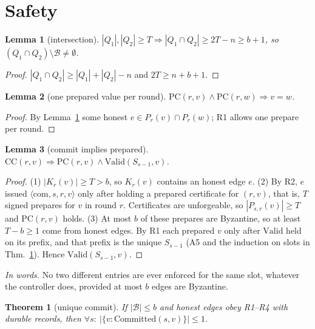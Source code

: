 \documentclass[conference]{IEEEtran}
\newtheorem{lemma}{Lemma}
\newtheorem{theorem}{Theorem}
\newcommand{\B}{\mathcal{B}}
\newcommand{\Pc}{\mathrm{PC}}
\newcommand{\Cc}{\mathrm{CC}}
\newcommand{\Val}{\mathrm{Valid}}
\newcommand{\Cm}{\mathrm{Committed}}
\newcommand{\words}[1]{\par\noindent\textit{In words.} #1\par\smallskip}
\begin{document}
\section{Safety}
\begin{lemma}[intersection]\label{lem:int}
$|Q_1|,|Q_2|\ge T\Rightarrow |Q_1\cap Q_2|\ge 2T-n\ge b+1$, so $(Q_1\cap Q_2)\setminus\B\ne\emptyset$.
\end{lemma}
\begin{proof}
$|Q_1\cap Q_2|\ge |Q_1|+|Q_2|-n$ and $2T\ge n+b+1$.
\end{proof}
\begin{lemma}[one prepared value per round]\label{lem:one}
$\Pc(r,v)\wedge\Pc(r,w)\Rightarrow v=w$.
\end{lemma}
\begin{proof}
By Lemma~\ref{lem:int} some honest $e\in P_r(v)\cap P_r(w)$; R1 allows one prepare per round.
\end{proof}
\begin{lemma}[commit implies prepared]\label{lem:cp}
$\Cc(r,v)\Rightarrow \Pc(r,v)\wedge \Val(S_{s-1},v)$.
\end{lemma}
\begin{proof}
(1) $|K_r(v)|\ge T>b$, so $K_r(v)$ contains an honest edge $e$. (2) By R2, $e$ issued $\langle\mathrm{com},s,r,v\rangle$ only after holding a prepared certificate for $(r,v)$, that is, $T$ signed prepares for $v$ in round $r$. Certificates are unforgeable, so $|P_{s,r}(v)|\ge T$ and $\Pc(r,v)$ holds. (3) At most $b$ of these prepares are Byzantine, so at least $T-b\ge1$ come from honest edges. By R1 each prepared $v$ only after $\Val$ held on its prefix, and that prefix is the unique $S_{s-1}$ (A5 and the induction on slots in Thm.~\ref{thm:unique}). Hence $\Val(S_{s-1},v)$.
\end{proof}
\words{No two different entries are ever enforced for the same slot, whatever the controller does, provided at most $b$ edges are Byzantine.}
\begin{theorem}[unique commit]\label{thm:unique}
If $|\B|\le b$ and honest edges obey R1--R4 with durable records, then $\forall s:\ |\{v:\Cm(s,v)\}|\le 1$.
\end{theorem}
\end{document}
